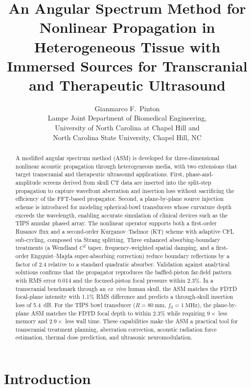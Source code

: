 \documentclass[11pt]{article}
\title{An Angular Spectrum Method for Nonlinear Propagation in
Heterogeneous Tissue with Immersed Sources for Transcranial and
Therapeutic Ultrasound}
\author{Gianmarco F.\ Pinton\\
\small Lampe Joint Department of Biomedical Engineering,\\
\small University of North Carolina at Chapel Hill and\\
\small North Carolina State University, Chapel Hill, NC}
\date{}
\begin{document}
\maketitle

\begin{abstract}
A modified angular spectrum method (ASM) is developed for
three-dimensional nonlinear acoustic propagation through heterogeneous
media, with two extensions that target transcranial and therapeutic
ultrasound applications.  First, phase-and-amplitude screens derived
from skull CT data are inserted into the split-step propagation to
capture wavefront aberration and insertion loss without sacrificing
the efficiency of the FFT-based propagator.  Second, a plane-by-plane
source injection scheme is introduced for modeling spherical-bowl
transducers whose curvature depth exceeds the wavelength, enabling
accurate simulation of clinical devices such as the TIPS annular
phased array.  The nonlinear operator supports both a first-order
Rusanov flux and a second-order Kurganov--Tadmor (KT) scheme with
adaptive CFL sub-cycling, composed via Strang splitting.  Three
enhanced absorbing-boundary treatments (a Wendland $C^2$ taper,
frequency-weighted spatial damping, and a first-order Engquist--Majda
super-absorbing correction) reduce boundary reflections by a factor
of 2.4 relative to a standard quadratic absorber.  Validation against
analytical solutions confirms that the propagator reproduces the
baffled-piston far-field pattern with RMS error 0.014 and the
focused-piston focal pressure within 2.3\%.  In a transcranial
benchmark through an \emph{ex~vivo} human skull, the ASM matches the
FDTD focal-plane intensity with 1.1\% RMS difference and predicts a
through-skull insertion loss of \SI{5.4}{\deci\bel}.  For the TIPS
bowl transducer ($R = \SI{80}{\milli\meter}$,
$f_0 = \SI{1}{\mega\hertz}$), the plane-by-plane ASM matches the FDTD
focal depth to within 2.3\% while requiring $9\times$ less memory and
$2.9\times$ less wall time.  These capabilities make the ASM a practical tool for transcranial
treatment planning, aberration correction, acoustic radiation force
estimation, thermal dose prediction, and ultrasonic neuromodulation.
\end{abstract}

\section{Introduction}
\label{sec:intro}
\end{document}

